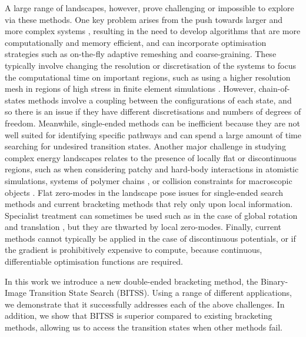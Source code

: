 \documentclass[aip,jcp,reprint,twocolumn]{revtex4-1}
\begin{document}
A large range of landscapes, however, prove challenging or impossible to explore via these methods.
One key problem arises from the push towards larger and more complex systems \cite{Trefethen2013,Shalf2020,Alexander2020}, resulting in the need to develop algorithms that are more computationally and memory efficient, and can incorporate optimisation strategies such as on-the-fly adaptive remeshing and coarse-graining.
These typically involve changing the resolution or discretisation of the systems to focus the computational time on important regions, such as using a higher resolution mesh in regions of high stress in finite element simulations \cite{Lee1994}.
However, chain-of-states methods involve a coupling between the configurations of each state, and so there is an issue if they have different discretisations and numbers of degrees of freedom.
Meanwhile, single-ended methods can be inefficient because they are not well suited for identifying specific pathways and can spend a large amount of time searching for undesired transition states.
Another major challenge in studying complex energy landscapes relates to the presence of locally flat or discontinuous regions, such as when considering patchy \cite{McMullen2018,Nguemaha2018,Chen2018b} and hard-body \cite{Richard2018,Santra2018} interactions in atomistic simulations, systems of polymer chains \cite{Mokkonen2016}, or collision constraints for macroscopic objects \cite{Wriggers2006}.
Flat zero-modes in the landscape pose issues for single-ended search methods and current bracketing methods that rely only upon local information.
Specialist treatment can sometimes be used such as in the case of global rotation and translation \cite{Page1988}, but they are thwarted by local zero-modes.
Finally, current methods cannot typically be applied in the case of discontinuous potentials, or if the gradient is prohibitively expensive to compute, because continuous, differentiable optimisation functions are required.

In this work we introduce a new double-ended bracketing method, the Binary-Image Transition State Search (BITSS).
Using a range of different applications, we demonstrate that it successfully addresses each of the above challenges.
In addition, we show that BITSS is superior compared to existing bracketing methods, allowing us to access the transition states when other methods fail.
\end{document}

